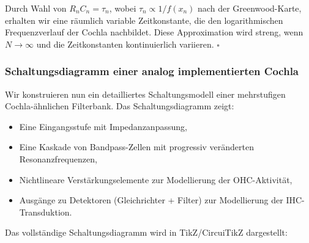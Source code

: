 ﻿\documentclass[12pt, a4paper]{article}
\theoremstyle{definition}
\theoremstyle{remark}
\begin{document}
Durch Wahl von $R_n C_n = \tau_n$, wobei $\tau_n \propto 1/f(x_n)$ nach der 
Greenwood-Karte, erhalten wir eine räumlich variable Zeitkonstante, die den 
logarithmischen Frequenzverlauf der Cochla nachbildet. Diese Approximation 
wird streng, wenn $N \to \infty$ und die Zeitkonstanten kontinuierlich variieren. 
$\square$

\subsubsection{Schaltungsdiagramm einer analog implementierten Cochla}

Wir konstruieren nun ein detailliertes Schaltungsmodell einer mehrstufigen 
Cochla-ähnlichen Filterbank. Das Schaltungsdiagramm zeigt:

\begin{itemize}
\item Eine Eingangsstufe mit Impedanzanpassung,
\item Eine Kaskade von Bandpass-Zellen mit progressiv veränderten Resonanzfrequenzen,
\item Nichtlineare Verstärkungselemente zur Modellierung der OHC-Aktivität,
\item Ausgänge zu Detektoren (Gleichrichter + Filter) zur Modellierung der IHC-Transduktion.
\end{itemize}

Das vollständige Schaltungsdiagramm wird in TikZ/CircuiTikZ dargestellt:
\end{document}
